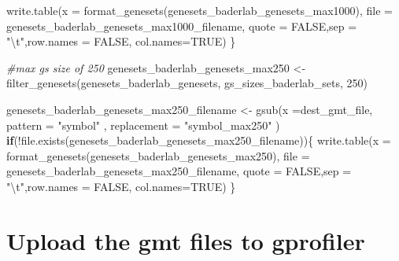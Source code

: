 \documentclass[
]{book}
\newenvironment{Shaded}{\begin{snugshade}}{\end{snugshade}}
\newcommand{\AttributeTok}[1]{\textcolor[rgb]{0.77,0.63,0.00}{#1}}
\newcommand{\CommentTok}[1]{\textcolor[rgb]{0.56,0.35,0.01}{\textit{#1}}}
\newcommand{\ConstantTok}[1]{\textcolor[rgb]{0.00,0.00,0.00}{#1}}
\newcommand{\ControlFlowTok}[1]{\textcolor[rgb]{0.13,0.29,0.53}{\textbf{#1}}}
\newcommand{\DecValTok}[1]{\textcolor[rgb]{0.00,0.00,0.81}{#1}}
\newcommand{\FunctionTok}[1]{\textcolor[rgb]{0.00,0.00,0.00}{#1}}
\newcommand{\NormalTok}[1]{#1}
\newcommand{\OtherTok}[1]{\textcolor[rgb]{0.56,0.35,0.01}{#1}}
\newcommand{\SpecialCharTok}[1]{\textcolor[rgb]{0.00,0.00,0.00}{#1}}
\newcommand{\StringTok}[1]{\textcolor[rgb]{0.31,0.60,0.02}{#1}}
\begin{document}
\begin{Shaded}
\begin{Highlighting}[]
  \FunctionTok{write.table}\NormalTok{(}\AttributeTok{x =} \FunctionTok{format\_genesets}\NormalTok{(genesets\_baderlab\_genesets\_max1000),}
            \AttributeTok{file =}\NormalTok{ genesets\_baderlab\_genesets\_max1000\_filename,}
            \AttributeTok{quote =} \ConstantTok{FALSE}\NormalTok{,}\AttributeTok{sep =} \StringTok{"}\SpecialCharTok{\textbackslash{}t}\StringTok{"}\NormalTok{,}\AttributeTok{row.names =} \ConstantTok{FALSE}\NormalTok{,}
            \AttributeTok{col.names=}\ConstantTok{TRUE}\NormalTok{)}
\NormalTok{\}}

\CommentTok{\#max gs size of 250}
\NormalTok{genesets\_baderlab\_genesets\_max250 }\OtherTok{\textless{}{-}} \FunctionTok{filter\_genesets}\NormalTok{(genesets\_baderlab\_genesets,}
\NormalTok{                                                      gs\_sizes\_baderlab\_sets, }
                                                      \DecValTok{250}\NormalTok{)}


\NormalTok{genesets\_baderlab\_genesets\_max250\_filename }\OtherTok{\textless{}{-}} \FunctionTok{gsub}\NormalTok{(}\AttributeTok{x =}\NormalTok{dest\_gmt\_file, }
                                                  \AttributeTok{pattern =} \StringTok{"symbol"}\NormalTok{ ,}
                                                  \AttributeTok{replacement =} \StringTok{"symbol\_max250"}
\NormalTok{                                                     )}
\ControlFlowTok{if}\NormalTok{(}\SpecialCharTok{!}\FunctionTok{file.exists}\NormalTok{(genesets\_baderlab\_genesets\_max250\_filename))\{}
  \FunctionTok{write.table}\NormalTok{(}\AttributeTok{x =} \FunctionTok{format\_genesets}\NormalTok{(genesets\_baderlab\_genesets\_max250),}
            \AttributeTok{file =}\NormalTok{ genesets\_baderlab\_genesets\_max250\_filename,}
            \AttributeTok{quote =} \ConstantTok{FALSE}\NormalTok{,}\AttributeTok{sep =} \StringTok{"}\SpecialCharTok{\textbackslash{}t}\StringTok{"}\NormalTok{,}\AttributeTok{row.names =} \ConstantTok{FALSE}\NormalTok{,}
            \AttributeTok{col.names=}\ConstantTok{TRUE}\NormalTok{)}
\NormalTok{\}}
\end{Highlighting}
\end{Shaded}

\hypertarget{upload-the-gmt-files-to-gprofiler}{%
\section{Upload the gmt files to gprofiler}\label{upload-the-gmt-files-to-gprofiler}}
\end{document}
